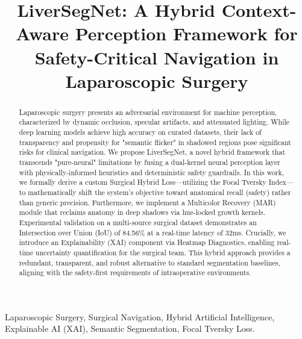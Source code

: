 \documentclass[conference]{IEEEtran}
\begin{document}
\title{LiverSegNet: A Hybrid Context-Aware Perception Framework for Safety-Critical Navigation in Laparoscopic Surgery}

\author{
}

\maketitle

\begin{abstract}
Laparoscopic surgery presents an adversarial environment for machine perception, characterized by dynamic occlusion, specular artifacts, and attenuated lighting. While deep learning models achieve high accuracy on curated datasets, their lack of transparency and propensity for "semantic flicker" in shadowed regions pose significant risks for clinical navigation. We propose LiverSegNet, a novel hybrid framework that transcends "pure-neural" limitations by fusing a dual-kernel neural perception layer with physically-informed heuristics and deterministic safety guardrails. In this work, we formally derive a custom Surgical Hybrid Loss—utilizing the Focal Tversky Index—to mathematically shift the system's objective toward anatomical recall (safety) rather than generic precision. Furthermore, we implement a Multicolor Recovery (MAR) module that reclaims anatomy in deep shadows via hue-locked growth kernels. Experimental validation on a multi-source surgical dataset demonstrates an Intersection over Union (IoU) of 84.56\% at a real-time latency of 32ms. Crucially, we introduce an Explainability (XAI) component via Heatmap Diagnostics, enabling real-time uncertainty quantification for the surgical team. This hybrid approach provides a redundant, transparent, and robust alternative to standard segmentation baselines, aligning with the safety-first requirements of intraoperative environments.
\end{abstract}

\begin{IEEEkeywords}
Laparoscopic Surgery, Surgical Navigation, Hybrid Artificial Intelligence, Explainable AI (XAI), Semantic Segmentation, Focal Tversky Loss.
\end{IEEEkeywords}
\end{document}
